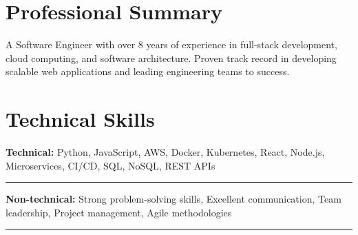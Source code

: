 \documentclass[]{friggeri-cv}
\newenvironment{skills}{%
  \par\noindent%
}{%
}
\newcommand{\skillsep}{%
  \par%
  \vspace{-3mm}
  \noindent%
  \textcolor{gray!30}{\rule{0.5\textwidth}{0.5pt}}%
  \vspace{-2mm}\par\vspace{-1mm}%
}
\newcommand{\category}[1]{%
  \par\noindent\textbf{#1:}\hspace{0.5em}%
}
\begin{document}

    
\vspace{5mm}
\section{Professional Summary}    
\vspace{-2mm}
A Software Engineer with over 8 years of experience in full-stack development, cloud computing, and software architecture. Proven track record in developing scalable web applications and leading engineering teams to success.

\section{Technical Skills}
\vspace{-2mm}
\begin{skills}

\category{Technical}Python, JavaScript, AWS, Docker, Kubernetes, React, Node.js, Microservices, CI/CD, SQL, NoSQL, REST APIs

\skillsep

\category{Non-technical}Strong problem-solving skills, Excellent communication, Team leadership, Project management, Agile methodologies

\skillsep

\end{skills}

\vspace{1mm}
\end{document}
